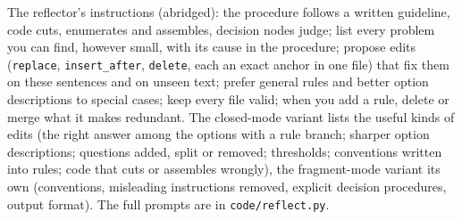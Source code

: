 The reflector's instructions (abridged): the procedure follows a written guideline, code cuts, enumerates and assembles, decision nodes judge; list every problem you can find, however small, with its cause in the procedure; propose edits (\texttt{replace}, \texttt{insert\_after}, \texttt{delete}, each an exact anchor in one file) that fix them on these sentences and on unseen text; prefer general rules and better option descriptions to special cases; keep every file valid; when you add a rule, delete or merge what it makes redundant. The closed-mode variant lists the useful kinds of edits (the right answer among the options with a rule branch; sharper option descriptions; questions added, split or removed; thresholds; conventions written into rules; code that cuts or assembles wrongly), the fragment-mode variant its own (conventions, misleading instructions removed, explicit decision procedures, output format). The full prompts are in \texttt{code/reflect.py}.
